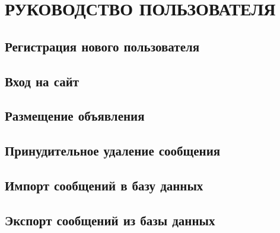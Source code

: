 \section[Руководство пользователя]{РУКОВОДСТВО ПОЛЬЗОВАТЕЛЯ}

\subsection{Регистрация нового пользователя}

\subsection{Вход на сайт}

\subsection{Размещение объявления}

\subsection{Принудительное удаление сообщения}

\subsection{Импорт сообщений в базу данных}

\subsection{Экспорт сообщений из базы данных}